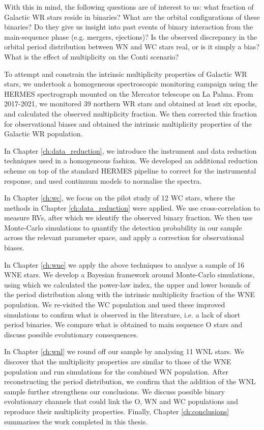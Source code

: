 With this in mind, the following questions are of interest to us: what fraction of Galactic WR stars reside in binaries? What are the orbital configurations of these binaries? Do they give us insight into past events of binary interaction from the main-sequence phase (e.g. mergers, ejections)? Is the observed discrepancy in the orbital period distribution between WN and WC stars real, or is it simply a bias? What is the effect of multiplicity on the Conti scenario?

To attempt and constrain the intrinsic multiplicity properties of Galactic WR stars, we undertook a homogeneous spectroscopic monitoring campaign using the HERMES spectrograph mounted on the Mercator telescope on La Palma. From 2017-2021, we monitored 39 northern WR stars and obtained at least six epochs, and calculated the observed multiplicity fraction. We then corrected this fraction for observational biases and obtained the intrinsic multiplicity properties of the Galactic WR population. 

In Chapter \ref{ch:data_reduction}, we introduce the instrument and data reduction techniques used in a homogeneous fashion. We developed an additional reduction scheme on top of the standard HERMES pipeline to correct for the instrumental response, and used continuum models to normalise the spectra. 

In Chapter \ref{ch:wc}, we focus on the pilot study of 12 WC stars, where the methods in Chapter \ref{ch:data_reduction} were applied. We use cross-correlation to measure RVs, after which we identify the observed binary fraction. We then use Monte-Carlo simulations to quantify the detection probability in our sample across the relevant parameter space, and apply a correction for observational biases.

In Chapter \ref{ch:wne} we apply the above techniques to analyse a sample of 16 WNE stars. We develop a Bayesian framework around Monte-Carlo simulations, using which we calculated the power-law index, the upper and lower bounds of the period distribution along with the intrinsic multiplicity fraction of the WNE population. We re-visited the WC population and used these improved simulations to confirm what is observed in the literature, i.e. a lack of short period binaries. We compare what is obtained to main sequence O stars and discuss possible evolutionary consequences.

In Chapter \ref{ch:wnl} we round off our sample by analysing 11 WNL stars. We discover that the multiplicity properties are similar to those of the WNE population and run simulations for the combined WN population. After reconstructing the period distribution, we confirm that the addition of the WNL sample further strengthens our conclusions. We discuss possible binary evolutionary channels that could link the O, WN and WC populations and reproduce their multiplicity properties. Finally, Chapter \ref{ch:conclusions} summarises the work completed in this thesis. 
 

